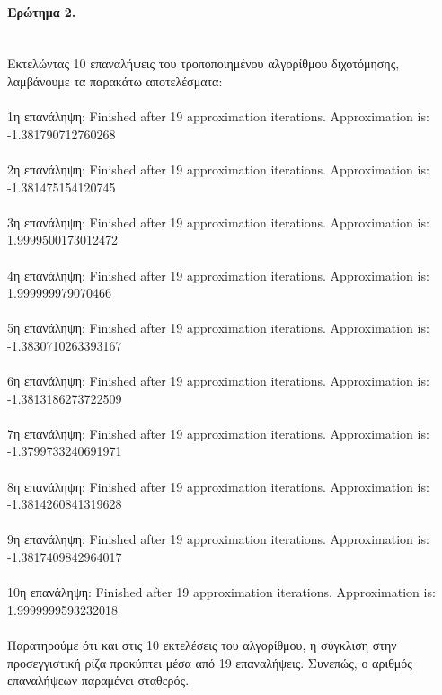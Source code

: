 \documentclass[a4paper,11pt]{article}
\newcommand{\lt}{\latintext}
\begin{document}
\paragraph{Ερώτημα 2.}\mbox{}\\
Εκτελώντας 10 επαναλήψεις του τροποποιημένου αλγορίθμου διχοτόμησης, λαμβάνουμε τα παρακάτω αποτελέσματα:\\
\\1η επανάληψη: {\lt Finished after 19 approximation iterations. Approximation is: -1.381790712760268}\\
\\2η επανάληψη: {\lt Finished after 19 approximation iterations. Approximation is: -1.381475154120745}\\
\\3η επανάληψη: {\lt Finished after 19 approximation iterations. Approximation is: 1.9999500173012472}\\
\\4η επανάληψη: {\lt Finished after 19 approximation iterations. Approximation is: 1.999999979070466}\\
\\5η επανάληψη: {\lt Finished after 19 approximation iterations. Approximation is: -1.3830710263393167}\\
\\6η επανάληψη: {\lt Finished after 19 approximation iterations. Approximation is: -1.3813186273722509}\\
\\7η επανάληψη: {\lt Finished after 19 approximation iterations. Approximation is: -1.3799733240691971}\\
\\8η επανάληψη: {\lt Finished after 19 approximation iterations. Approximation is: -1.3814260841319628}\\
\\9η επανάληψη: {\lt Finished after 19 approximation iterations. Approximation is: -1.3817409842964017}\\
\\10η επανάληψη: {\lt Finished after 19 approximation iterations. Approximation is: 1.9999999593232018}\\
\\Παρατηρούμε ότι και στις 10 εκτελέσεις του αλγορίθμου, η σύγκλιση στην προσεγγιστική ρίζα προκύπτει μέσα από 19 επαναλήψεις. Συνεπώς, ο αριθμός επαναλήψεων παραμένει σταθερός.
\end{document}
